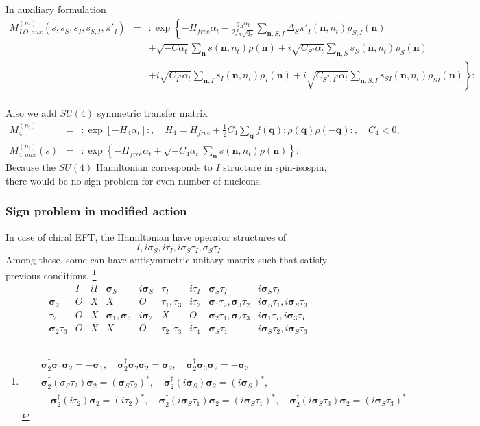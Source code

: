 \documentclass[10pt]{book}
\def\bm{\boldsymbol}
\newcommand{\bea}{\begin{eqnarray}}
\newcommand{\eea}{\end{eqnarray}}
\newcommand{\no}{\nonumber \\}
\def\vs{{\bm \sigma}}
\def\vn{{\bm n}}
\def\vq{{\bm q}}
\begin{document}
In auxiliary formulation
\bea 
M_{LO,aux}^{(n_t)}(s,s_{S},s_{I},s_{S,I},\pi'_I )
&=& :\exp\left\{ -H_{free}\alpha_t 
  -\frac{ g_{A}\alpha_t}{2f_\pi\sqrt{q_\pi}}\sum_{\vn,S,I}
   \Delta_{S}\pi'_{I}(\vn,n_t)\rho_{S,I}(\vn) \right. \no & & 
   +\sqrt{-C\alpha_t}\sum_{\vn}s(\vn,n_t)\rho(\vn)
   +i\sqrt{C_{S^2}\alpha_t}\sum_{\vn,S}s_S(\vn,n_t)\rho_S(\vn) 
   \no & &
   \left.
   +i\sqrt{C_{I^2}\alpha_t}\sum_{\vn,I}s_I(\vn,n_t)\rho_I(\vn) 
   +i\sqrt{C_{S^2,I^2}\alpha_t}\sum_{\vn,S,I}s_{SI}(\vn,n_t)\rho_{SI}(\vn) 
 \right\}: \no 
\eea  

Also we add $SU(4)$ symmetric transfer matrix
\bea 
M_4^{(n_t)}&=&:\exp[-H_4\alpha_t]:,\quad H_4=H_{free}
+\frac{1}{2}C_4\sum_{\vq}f(\vq):\rho(\vq)\rho(-\vq):,\quad C_4<0,\no 
M^{(n_t)}_{4,aux}(s)&=&:\exp\left\{ -H_{free}\alpha_t
   +\sqrt{-C_4\alpha_t}\sum_{\vn}s(\vn,n_t)\rho(\vn) \right\}:
\eea 
Because the $SU(4)$ Hamiltonian corresponds to $I$ structure in spin-isospin,
there would be no sign problem for even number of nucleons. 

\subsubsection{Sign problem in modified action} 
In case of chiral EFT, the Hamiltonian have operator structures of
$$ I, i\sigma_S, i\tau_I, i\sigma_S\tau_I, \sigma_S\tau_I $$
Among these, some can have antisymmetric unitary matrix such that satisfy previous 
conditions. \footnote{
\bea 
& &\vs_2^\dagger\vs_1\vs_2=-\vs_1,
\quad \vs_2^\dagger\vs_2\vs_2=\vs_2,
\quad \vs_2^\dagger\vs_3\vs_2=-\vs_3
\no 
& & \vs_2^\dagger(\sigma_S\tau_2)\vs_2 = (\vs_S\tau_2)^*,
\quad \vs_2^\dagger(i\vs_S)\vs_2 = (i\vs_S)^*,  \no  & &
\quad \vs_2^\dagger(i\tau_2)\vs_2= (i\tau_2)^*,
\quad \vs_2^\dagger(i\vs_S\tau_1)\vs_2=   (i\vs_S\tau_1)^*,
\quad \vs_2^\dagger(i\vs_S\tau_3)\vs_2=   (i\vs_S\tau_3)^*
\eea 
} 
\begin{equation}
\begin{array}{ccccccccc}
       & I & i I& \vs_S & i\vs_S & \tau_I & i\tau_I & \vs_S\tau_I & i \vs_S\tau_I \no 
 \vs_2 & O & X  &  X     &  O  &   \tau_1,\tau_3 &  i\tau_2   &  \vs_1\tau_2,\vs_3\tau_2  & i\vs_S\tau_1, i\vs_S\tau_3  \no
 \tau_2 & O & X &  \vs_1,\vs_3 & i\vs_2 & X & O &
   \vs_2\tau_1,\vs_2\tau_3 & i\vs_1\tau_I, i\vs_3\tau_I \no 
\vs_2\tau_3 & O & X & X & O & \tau_2,\tau_3 & i\tau_1 &\vs_S\tau_1
   & i\vs_S\tau_2, i\vs_S\tau_3 
\end{array} 
\end{equation}
\end{document}
